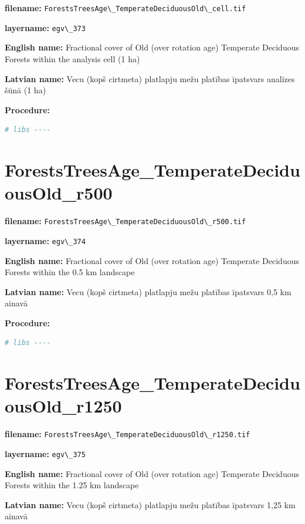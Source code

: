 \documentclass[
]{book}
\newcommand{\passthrough}[1]{#1}
\begin{document}
\textbf{filename:} \passthrough{\lstinline!ForestsTreesAge\_TemperateDeciduousOld\_cell.tif!}

\textbf{layername:} \passthrough{\lstinline!egv\_373!}

\textbf{English name:} Fractional cover of Old (over rotation age) Temperate Deciduous Forests within the analysis cell (1 ha)

\textbf{Latvian name:} Vecu (kopš cirtmeta) platlapju mežu platības īpatsvars analīzes šūnā (1 ha)

\textbf{Procedure:}

\begin{lstlisting}[language=R]
# libs ----
\end{lstlisting}

\section{ForestsTreesAge\_TemperateDeciduousOld\_r500}\label{ch06.374}

\textbf{filename:} \passthrough{\lstinline!ForestsTreesAge\_TemperateDeciduousOld\_r500.tif!}

\textbf{layername:} \passthrough{\lstinline!egv\_374!}

\textbf{English name:} Fractional cover of Old (over rotation age) Temperate Deciduous Forests within the 0.5 km landscape

\textbf{Latvian name:} Vecu (kopš cirtmeta) platlapju mežu platības īpatsvars 0,5 km ainavā

\textbf{Procedure:}

\begin{lstlisting}[language=R]
# libs ----
\end{lstlisting}

\section{ForestsTreesAge\_TemperateDeciduousOld\_r1250}\label{ch06.375}

\textbf{filename:} \passthrough{\lstinline!ForestsTreesAge\_TemperateDeciduousOld\_r1250.tif!}

\textbf{layername:} \passthrough{\lstinline!egv\_375!}

\textbf{English name:} Fractional cover of Old (over rotation age) Temperate Deciduous Forests within the 1.25 km landscape

\textbf{Latvian name:} Vecu (kopš cirtmeta) platlapju mežu platības īpatsvars 1,25 km ainavā
\end{document}
